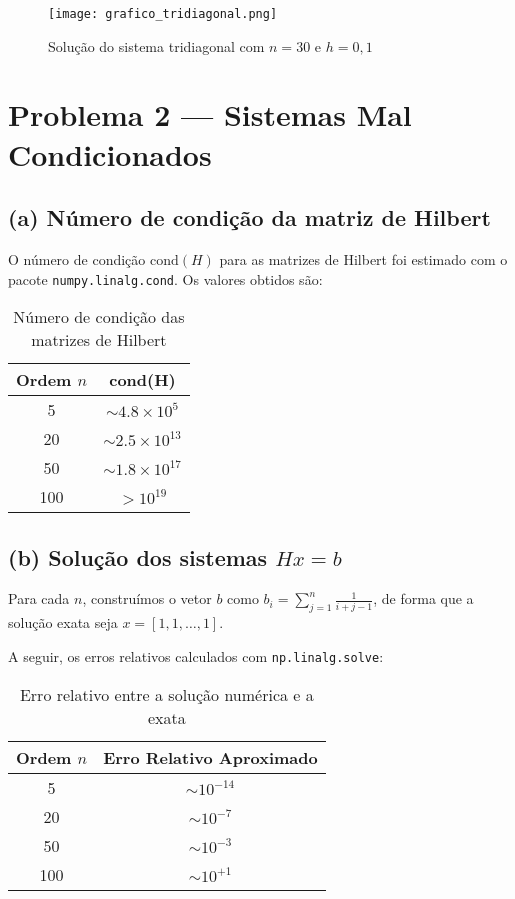 \documentclass[12pt]{article}
\begin{document}
\begin{figure}[H]
    \centering
    \texttt{[image: grafico\_tridiagonal.png]}
    \caption{Solução do sistema tridiagonal com $n=30$ e $h=0{,}1$}
\end{figure}

\newpage
\section*{Problema 2 — Sistemas Mal Condicionados}

\subsection*{(a) Número de condição da matriz de Hilbert}

O número de condição $\text{cond}(H)$ para as matrizes de Hilbert foi estimado com o pacote \texttt{numpy.linalg.cond}. Os valores obtidos são:

\begin{table}[H]
\centering
\begin{tabular}{|c|c|}
\hline
\textbf{Ordem $n$} & \textbf{cond(H)} \\
\hline
5 & $\sim 4.8 \times 10^5$ \\
20 & $\sim 2.5 \times 10^{13}$ \\
50 & $\sim 1.8 \times 10^{17}$ \\
100 & $> 10^{19}$ \\
\hline
\end{tabular}
\caption{Número de condição das matrizes de Hilbert}
\end{table}

\subsection*{(b) Solução dos sistemas $Hx = b$}

Para cada $n$, construímos o vetor $b$ como $b_i = \sum_{j=1}^{n} \frac{1}{i+j-1}$, de forma que a solução exata seja $x = [1, 1, \ldots, 1]$.

A seguir, os erros relativos calculados com \texttt{np.linalg.solve}:

\begin{table}[H]
\centering
\begin{tabular}{|c|c|}
\hline
\textbf{Ordem $n$} & \textbf{Erro Relativo Aproximado} \\
\hline
5 & $\sim 10^{-14}$ \\
20 & $\sim 10^{-7}$ \\
50 & $\sim 10^{-3}$ \\
100 & $\sim 10^{+1}$ \\
\hline
\end{tabular}
\caption{Erro relativo entre a solução numérica e a exata}
\end{table}
\end{document}
